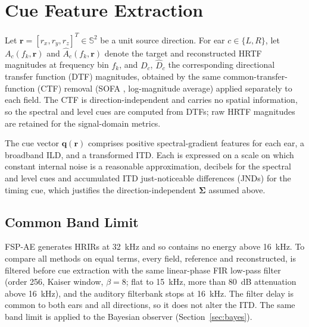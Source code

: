 \documentclass[journal]{IEEEtran}
\begin{document}
\section{Cue Feature Extraction}\label{sec:cues}
Let \(\mathbf{r}=[r_x,r_y,r_z]^T\in\mathbb{S}^{2}\) be a unit source direction. For ear \(c\in\{L,R\}\), let \(A_c(f_k,\mathbf{r})\) and \(\widehat{A}_c(f_k,\mathbf{r})\) denote the target and reconstructed HRTF magnitudes at frequency bin \(f_k\), and \(D_c\), \(\widehat D_c\) the corresponding directional transfer function (DTF) magnitudes, obtained by the same common-transfer-function (CTF) removal (SOFA , log-magnitude average) applied separately to each field. The CTF is direction-independent and carries no spatial information, so the spectral and level cues are computed from DTFs; raw HRTF magnitudes are retained for the signal-domain metrics.

The cue vector \(\mathbf q(\mathbf r)\) comprises positive spectral-gradient features for each ear, a broadband ILD, and a transformed ITD. Each is expressed on a scale on which constant internal noise is a reasonable approximation, decibels for the spectral and level cues and accumulated ITD just-noticeable differences (JNDs) for the timing cue, which justifies the direction-independent \(\boldsymbol\Sigma\) assumed above.

\subsection{Common Band Limit}
FSP-AE generates HRIRs at 32~kHz and so contains no energy above 16~kHz. To compare all methods on equal terms, every field, reference and reconstructed, is filtered before cue extraction with the same linear-phase FIR low-pass filter (order 256, Kaiser window, \(\beta=8\); flat to 15~kHz, more than 80~dB attenuation above 16~kHz), and the auditory filterbank stops at 16~kHz. The filter delay is common to both ears and all directions, so it does not alter the ITD. The same band limit is applied to the Bayesian observer (Section~\ref{sec:bayes}).
\end{document}
